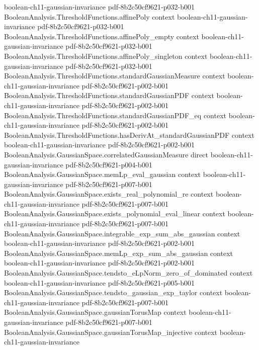 \begin{lemma}
  {boolean-ch11-gaussian-invariance}
  {pdf-8b2c50cf9621-p032-b001}
\proofstep
  {BooleanAnalysis.ThresholdFunctions.affinePoly}
  {context}
  {boolean-ch11-gaussian-invariance}
  {pdf-8b2c50cf9621-p032-b001}
\proofstep
  {BooleanAnalysis.ThresholdFunctions.affinePoly_empty}
  {context}
  {boolean-ch11-gaussian-invariance}
  {pdf-8b2c50cf9621-p032-b001}
\proofstep
  {BooleanAnalysis.ThresholdFunctions.affinePoly_singleton}
  {context}
  {boolean-ch11-gaussian-invariance}
  {pdf-8b2c50cf9621-p032-b001}
\proofstep
  {BooleanAnalysis.ThresholdFunctions.standardGaussianMeasure}
  {context}
  {boolean-ch11-gaussian-invariance}
  {pdf-8b2c50cf9621-p002-b001}
\proofstep
  {BooleanAnalysis.ThresholdFunctions.standardGaussianPDF}
  {context}
  {boolean-ch11-gaussian-invariance}
  {pdf-8b2c50cf9621-p002-b001}
\proofstep
  {BooleanAnalysis.ThresholdFunctions.standardGaussianPDF_eq}
  {context}
  {boolean-ch11-gaussian-invariance}
  {pdf-8b2c50cf9621-p002-b001}
\proofstep
  {BooleanAnalysis.ThresholdFunctions.hasDerivAt_standardGaussianPDF}
  {context}
  {boolean-ch11-gaussian-invariance}
  {pdf-8b2c50cf9621-p002-b001}
\proofstep
  {BooleanAnalysis.GaussianSpace.correlatedGaussianMeasure}
  {direct}
  {boolean-ch11-gaussian-invariance}
  {pdf-8b2c50cf9621-p004-b001}
\proofstep
  {BooleanAnalysis.GaussianSpace.memLp_eval_gaussian}
  {context}
  {boolean-ch11-gaussian-invariance}
  {pdf-8b2c50cf9621-p007-b001}
\proofstep
  {BooleanAnalysis.GaussianSpace.exists_real_polynomial_re}
  {context}
  {boolean-ch11-gaussian-invariance}
  {pdf-8b2c50cf9621-p007-b001}
\proofstep
  {BooleanAnalysis.GaussianSpace.exists_polynomial_eval_linear}
  {context}
  {boolean-ch11-gaussian-invariance}
  {pdf-8b2c50cf9621-p007-b001}
\proofstep
  {BooleanAnalysis.GaussianSpace.integrable_exp_sum_abs_gaussian}
  {context}
  {boolean-ch11-gaussian-invariance}
  {pdf-8b2c50cf9621-p002-b001}
\proofstep
  {BooleanAnalysis.GaussianSpace.memLp_exp_sum_abs_gaussian}
  {context}
  {boolean-ch11-gaussian-invariance}
  {pdf-8b2c50cf9621-p002-b001}
\proofstep
  {BooleanAnalysis.GaussianSpace.tendsto_eLpNorm_zero_of_dominated}
  {context}
  {boolean-ch11-gaussian-invariance}
  {pdf-8b2c50cf9621-p005-b001}
\proofstep
  {BooleanAnalysis.GaussianSpace.tendsto_gaussian_exp_taylor}
  {context}
  {boolean-ch11-gaussian-invariance}
  {pdf-8b2c50cf9621-p007-b001}
\proofstep
  {BooleanAnalysis.GaussianSpace.gaussianTorusMap}
  {context}
  {boolean-ch11-gaussian-invariance}
  {pdf-8b2c50cf9621-p007-b001}
\proofstep
  {BooleanAnalysis.GaussianSpace.gaussianTorusMap_injective}
  {context}
  {boolean-ch11-gaussian-invariance}

\end{lemma}
